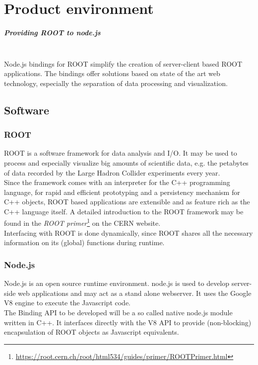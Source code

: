 \chapter{Product environment}

\paragraph{Providing ROOT to node.js}\\
Node.js bindings for ROOT simplify the creation of server-client based ROOT applications. The bindings offer solutions based on state of the art web technology, especially the separation of data 
processing and visualization.

\section{Software}
\subsection{ROOT}
ROOT is a software framework for data analysis and I/O. It may be used to process and especially visualize big amounts of scientific data, e.g. the petabytes of data recorded by the Large Hadron Collider experiments every year.\\
Since the framework comes with an interpreter for the C++ programming language, for rapid and efficient prototyping and a persistency mechanism for C++ objects, ROOT based applications are  extensible and as feature rich as the C++ language itself.
A detailed introduction to the ROOT framework may be found in the \textit{ROOT  primer}\footnote[1]{\url{https://root.cern.ch/root/html534/guides/primer/ROOTPrimer.html}}
on the CERN website.\\
Interfacing with ROOT is done dynamically, since ROOT shares all the necessary information on its (global) functions during runtime.

\subsection{Node.js}
Node.js is an open source runtime environment. node.js is used to develop server-side web applications and may act as a 
stand alone webserver. It uses the Google V8 engine to execute the Javascript code. \\
The Binding API to be developed will be a so called native node.js module written in C++. It interfaces directly with the V8 API to provide (non-blocking) encapsulation of ROOT objects as Javascript equivalents.

